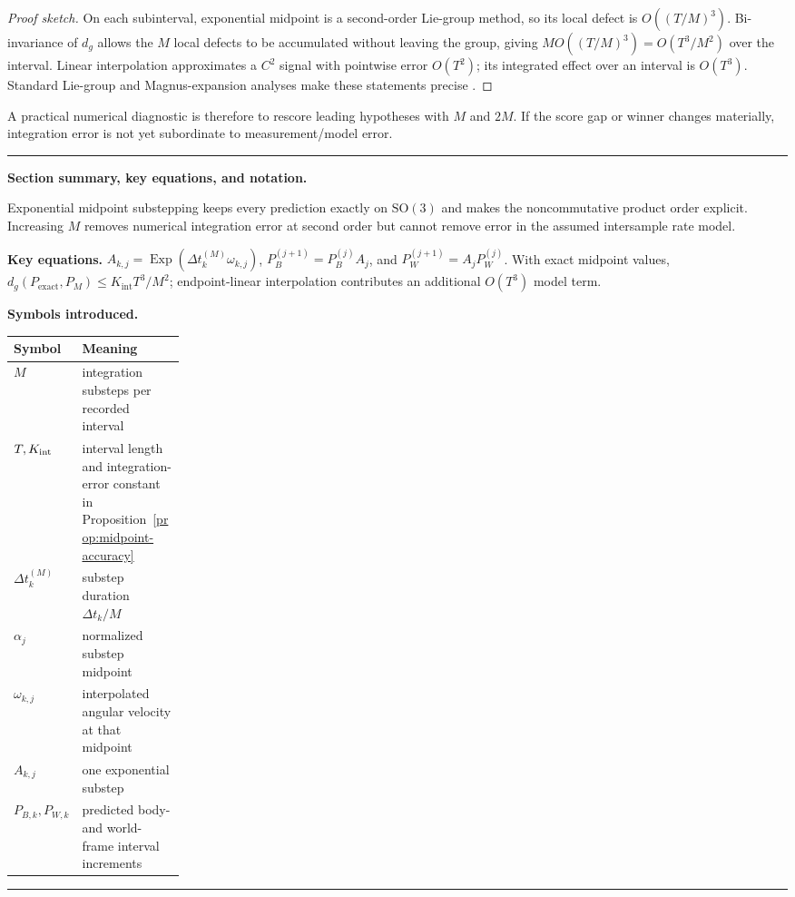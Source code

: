 \documentclass[11pt]{article}
\newcommand{\SO}{\mathrm{SO}(3)}
\newcommand{\Exp}{\operatorname{Exp}}
\newenvironment{sectionrecap}
{\par\medskip\begingroup\small\noindent\rule{\linewidth}{0.4pt}\par
\smallskip\noindent\textbf{Section summary, key equations, and notation.}\par\smallskip}
{\par\smallskip\noindent\rule{\linewidth}{0.4pt}\par\endgroup\medskip}
\begin{document}
    \begin{proof}[Proof sketch]
On each subinterval, exponential midpoint is a second-order Lie-group method, so its
local defect is $O((T/M)^3)$. Bi-invariance of $d_g$ allows the $M$ local defects to be
accumulated without leaving the group, giving $M O((T/M)^3)=O(T^3/M^2)$ over the
interval. Linear interpolation approximates a $C^2$ signal with pointwise error
$O(T^2)$; its integrated effect over an interval is $O(T^3)$. Standard Lie-group and
Magnus-expansion analyses make these statements precise \cite{iserles2000,blanes2009}.
    \end{proof}

    A practical numerical diagnostic is therefore to rescore leading hypotheses with $M$
    and $2M$. If the score gap or winner changes materially, integration error is not yet
    subordinate to measurement/model error.

    \begin{sectionrecap}
        Exponential midpoint substepping keeps every prediction exactly on $\SO$ and makes the
        noncommutative product order explicit. Increasing $M$ removes numerical integration
        error at second order but cannot remove error in the assumed intersample rate model.

        \noindent\textbf{Key equations.}
        \(A_{k,j}=\Exp(\Delta t_k^{(M)}\omega_{k,j})\),
        \(P_{B}^{(j+1)}=P_B^{(j)}A_j\), and
        \(P_W^{(j+1)}=A_jP_W^{(j)}\). With exact midpoint values,
        \(d_g(P_{\mathrm{exact}},P_M)\le K_{\mathrm{int}}T^3/M^2\); endpoint-linear interpolation contributes
        an additional $O(T^3)$ model term.

        \noindent\textbf{Symbols introduced.}
        \par\noindent\begin{tabularx}{\linewidth}{@{}p{0.22\linewidth}Y@{}}
\toprule
Symbol & Meaning \\
\midrule
$M$ & integration substeps per recorded interval \\
$T,K_{\rm int}$ & interval length and integration-error constant in Proposition~\ref{prop:midpoint-accuracy} \\
$\Delta t_k^{(M)}$ & substep duration $\Delta t_k/M$ \\
$\alpha_j$ & normalized substep midpoint \\
$\omega_{k,j}$ & interpolated angular velocity at that midpoint \\
$A_{k,j}$ & one exponential substep \\
$P_{B,k},P_{W,k}$ & predicted body- and world-frame interval increments \\
\bottomrule
        \end{tabularx}
    \end{sectionrecap}
\end{document}
